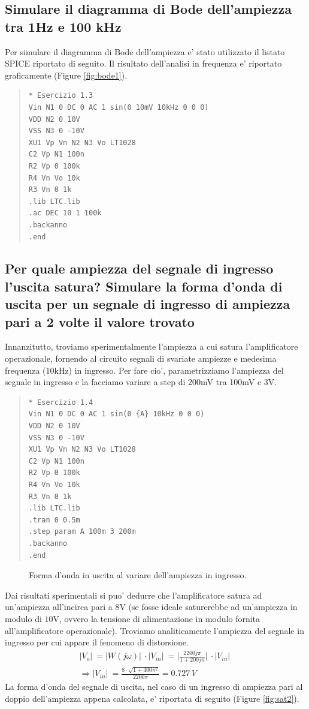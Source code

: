 \documentclass[a4paper,10pt]{article}
\begin{document}
\subsection{Simulare il diagramma di Bode dell'ampiezza tra 1Hz e 100 kHz}
Per simulare il diagramma di Bode dell'ampiezza e' stato utilizzato il listato SPICE riportato di seguito. Il risultato dell'analisi in frequenza e' riportato graficamente (Figure \ref{fig:bode1}).
\begin{quote}
\begin{verbatim}
* Esercizio 1.3
Vin N1 0 DC 0 AC 1 sin(0 10mV 10kHz 0 0 0)
VDD N2 0 10V
VSS N3 0 -10V
XU1 Vp Vn N2 N3 Vo LT1028
C2 Vp N1 100n
R2 Vp 0 100k
R4 Vn Vo 10k
R3 Vn 0 1k
.lib LTC.lib
.ac DEC 10 1 100k
.backanno
.end
\end{verbatim}
\end{quote}


\subsection{Per quale ampiezza del segnale di ingresso l'uscita satura? Simulare la forma  d'onda di uscita per un segnale di ingresso di ampiezza pari a 2 volte il valore trovato}
Innanzitutto, troviamo sperimentalmente l'ampiezza a cui satura l'amplificatore operazionale, fornendo al circuito segnali di svariate ampiezze e medesima frequenza (10kHz) in ingresso. Per fare cio', parametrizziamo l'ampiezza del segnale in ingresso e la facciamo variare a step di 200mV tra 100mV e 3V.
\small
\begin{quote}
\begin{verbatim}
* Esercizio 1.4
Vin N1 0 DC 0 AC 1 sin(0 {A} 10kHz 0 0 0)
VDD N2 0 10V
VSS N3 0 -10V
XU1 Vp Vn N2 N3 Vo LT1028
C2 Vp N1 100n
R2 Vp 0 100k
R4 Vn Vo 10k
R3 Vn 0 1k
.lib LTC.lib
.tran 0 0.5m
.step param A 100m 3 200m
.backanno
.end
\end{verbatim}
\end{quote}
\normalsize
\begin{figure}[h!]
	\centering
  	\caption{Forma d'onda in uscita al variare dell'ampiezza in ingresso.}
  	\label{fig:sat1}
\end{figure}
Dai risultati sperimentali si puo' dedurre che l'amplificatore satura ad un'ampiezza all'incirca pari a $8$V (se fosse ideale saturerebbe ad un'ampiezza in modulo di $10$V, ovvero la tensione di alimentazione in modulo fornita all'amplificatore operazionale). Troviamo analiticamente l'ampiezza del segnale in ingresso per cui appare il fenomeno di distorsione.
\begin{gather*}
	\lvert V_o \rvert\ = \lvert W(j\omega) \rvert\ \cdot \lvert V_{in} \rvert\ = \lvert \frac{2200j\pi}{1+200j\pi} \rvert\ \cdot \lvert V_{in} \rvert\ \\
	\Rightarrow \lvert V_{in} \rvert\ = \frac{8\cdot \sqrt{1+400\pi^2}}{2200\pi} = 0.727\,V
\end{gather*}
La forma d'onda del segnale di uscita, nel caso di un ingresso di ampiezza pari al doppio dell'ampiezza appena calcolata, e' riportata di seguito (Figure \ref{fig:sat2}).
    
\end{document}
